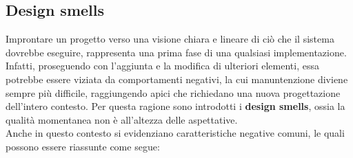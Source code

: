 \documentclass{article}
\begin{document}
\subsection*{Design smells}
\large
Improntare un progetto verso una visione chiara e lineare di ciò che il sistema dovrebbe eseguire, rappresenta una prima fase di una qualsiasi implementazione. Infatti, proseguendo con l'aggiunta e la modifica di ulteriori elementi, essa potrebbe essere viziata da comportamenti negativi, la cui manuntenzione diviene sempre più difficile, raggiungendo apici che richiedano una nuova progettazione dell'intero contesto. Per questa ragione sono introdotti i \textbf{design smells}, ossia la qualità momentanea non è all'altezza delle aspettative.\vspace*{14pt}\\
Anche in questo contesto si evidenziano caratteristiche negative comuni, le quali possono essere riassunte come segue:
\end{document}
